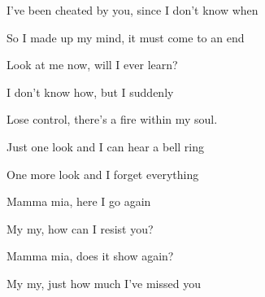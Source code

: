 \begin{song}


\begin{vchordbox}
 \par
{} \par
{} \par
{} \par
{} \par
{} \par
{} \par
{} \par
{} \par
\end{vchordbox}

\large

\bigskip

\Intro {}    \par

\bigskip

I've been cheated by you, since I don't know when \par
{}So I made up my mind, it must come to an end \par
{}Look at me now,  will I ever learn? \par
{}I don't know how,  but I suddenly \par
{}Lose control, there's a fire within my soul.  \par


\bigskip
\begin{chorusbox}{\PrechorusAndChorus}
Just one look and I can hear a bell ring  \par
{}One more look and I forget everything \par

\bigskip

 Mamma mia, here I go again \par
{} My  my, how can I resist you? \par
{} Mamma mia, does it show again? \par
{} My  my, just how much I've missed you \par
\end{chorusbox}


\end{song}
